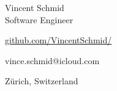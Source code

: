 \vspace{0pt}
{\sectionfont\fontsize{28}{30}\selectfont
    Vincent Schmid\\[0.25em]
}
{\sectionfont\fontsize{13}{14}\selectfont\color{altColor}
    Software Engineer\\[0.5em]
}
\begin{minipage}[t]{0.28\linewidth}
    \begin{description}[labelwidth=2em]
        \item[\faGithub\color{altColor}] \href{https://github.com/VincentSchmid/}{github.com/VincentSchmid/}
        \item[\faEnvelopeO\color{altColor}] vince.schmid@icloud.com
    \end{description}
    \vspace{1.5em}
\end{minipage}\hfill
\begin{minipage}[t]{0.68\linewidth}
    \begin{description}[labelwidth=2em]
        \item[\faMapMarker\color{altColor}] Zürich, Switzerland
    \end{description}
\end{minipage}
